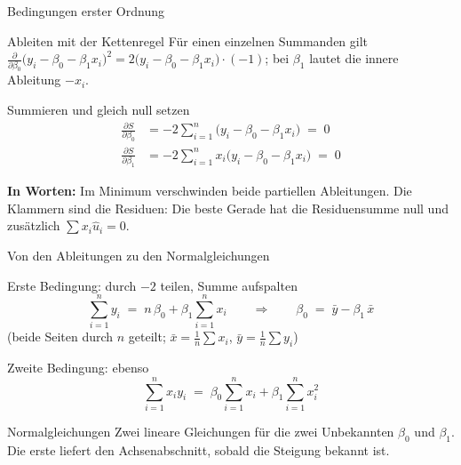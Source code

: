 \documentclass[aspectratio=169,11pt]{beamer}
\begin{document}
\begin{frame}{Bedingungen erster Ordnung}
  \begin{block}{Ableiten mit der Kettenregel}
    Für einen einzelnen Summanden gilt
    $\frac{\partial}{\partial \beta_0}\bigl(y_i - \beta_0 - \beta_1 x_i\bigr)^{2}
      = 2\bigl(y_i - \beta_0 - \beta_1 x_i\bigr)\cdot(-1)$;
    bei $\beta_1$ lautet die innere Ableitung $-x_i$.
  \end{block}

  \begin{block}{Summieren und gleich null setzen}
    \vspace{-8pt}
    \begin{align*}
      \frac{\partial S}{\partial \beta_0} &= -2\sum_{i=1}^{n}\bigl(y_i - \beta_0 - \beta_1 x_i\bigr) \;=\; 0 \\
      \frac{\partial S}{\partial \beta_1} &= -2\sum_{i=1}^{n} x_i\bigl(y_i - \beta_0 - \beta_1 x_i\bigr) \;=\; 0
    \end{align*}
  \end{block}

  \textbf{In Worten:} Im Minimum verschwinden beide partiellen Ableitungen.
  Die Klammern sind die Residuen: Die beste Gerade hat die Residuensumme null
  und zusätzlich $\sum x_i \hat{u}_i = 0$.
\end{frame}

\begin{frame}{Von den Ableitungen zu den Normalgleichungen}
  \begin{block}{Erste Bedingung: durch $-2$ teilen, Summe aufspalten}
    \[
      \sum_{i=1}^{n} y_i \;=\; n\,\beta_0 + \beta_1 \sum_{i=1}^{n} x_i
      \qquad\Longrightarrow\qquad
      \beta_0 \;=\; \bar{y} - \beta_1\,\bar{x}
    \]
    \footnotesize (beide Seiten durch $n$ geteilt; $\bar{x} = \frac{1}{n}\sum x_i$, $\bar{y} = \frac{1}{n}\sum y_i$)
  \end{block}

  \begin{block}{Zweite Bedingung: ebenso}
    \[
      \sum_{i=1}^{n} x_i y_i \;=\; \beta_0 \sum_{i=1}^{n} x_i + \beta_1 \sum_{i=1}^{n} x_i^{2}
    \]
  \end{block}

  \begin{exampleblock}{Normalgleichungen}
    Zwei lineare Gleichungen für die zwei Unbekannten $\beta_0$ und $\beta_1$.
    Die erste liefert den Achsenabschnitt, sobald die Steigung bekannt ist.
  \end{exampleblock}
\end{frame}
\end{document}
